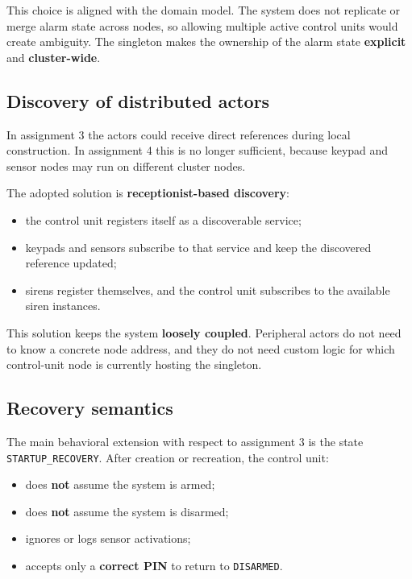 This choice is aligned with the domain model. The system does not replicate or
merge alarm state across nodes, so allowing multiple active control units would
create ambiguity. The singleton makes the ownership of the alarm state
\textbf{explicit} and \textbf{cluster-wide}.

\subsection{Discovery of distributed actors}

In assignment 3 the actors could receive direct references during local
construction. In assignment 4 this is no longer sufficient, because keypad and
sensor nodes may run on different cluster nodes.

The adopted solution is \textbf{receptionist-based discovery}:
\begin{itemize}
    \item the control unit registers itself as a discoverable service;
    \item keypads and sensors subscribe to that service and keep the discovered reference updated;
    \item sirens register themselves, and the control unit subscribes to the available siren instances.
\end{itemize}

This solution keeps the system \textbf{loosely coupled}. Peripheral actors do not
need to know a concrete node address, and they do not need custom logic for
which control-unit node is currently hosting the singleton.

\subsection{Recovery semantics}

The main behavioral extension with respect to assignment 3 is the state
\texttt{STARTUP\_RECOVERY}. After creation or recreation, the control unit:
\begin{itemize}
    \item does \textbf{not} assume the system is armed;
    \item does \textbf{not} assume the system is disarmed;
    \item ignores or logs sensor activations;
    \item accepts only a \textbf{correct PIN} to return to \texttt{DISARMED}.
\end{itemize}

